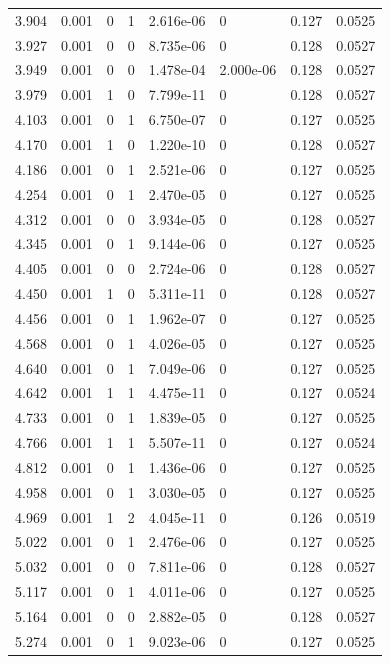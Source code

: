 \documentclass[preview]{standalone}
\begin{document}
{{{\begin{tabular}{L{1.2cm}C{1.2cm} C{0.3cm}C{0.5cm} C{1.4cm}C{1.4cm} C{1.4cm}C{1.4cm}}
  3.904  &  0.001  & 0     &  1 &  2.616e-06  & 0  & 0.127 &  0.0525   \\ 
  3.927  &  0.001  & 0     &  0 &  8.735e-06  & 0  & 0.128 &  0.0527   \\ 
  3.949  &  0.001  & 0     &  0 &  1.478e-04  & 2.000e-06  & 0.128 &  0.0527   \\ 
  3.979  &  0.001  & 1     &  0 &  7.799e-11  & 0  & 0.128 &  0.0527   \\ 
  4.103  &  0.001  & 0     &  1 &  6.750e-07  & 0  & 0.127 &  0.0525   \\ 
  4.170  &  0.001  & 1     &  0 &  1.220e-10  & 0  & 0.128 &  0.0527   \\ 
  4.186  &  0.001  & 0     &  1 &  2.521e-06  & 0  & 0.127 &  0.0525   \\ 
  4.254  &  0.001  & 0     &  1 &  2.470e-05  & 0  & 0.127 &  0.0525   \\ 
  4.312  &  0.001  & 0     &  0 &  3.934e-05  & 0  & 0.128 &  0.0527   \\ 
  4.345  &  0.001  & 0     &  1 &  9.144e-06  & 0  & 0.127 &  0.0525   \\ 
  4.405  &  0.001  & 0     &  0 &  2.724e-06  & 0  & 0.128 &  0.0527   \\ 
  4.450  &  0.001  & 1     &  0 &  5.311e-11  & 0  & 0.128 &  0.0527   \\ 
  4.456  &  0.001  & 0     &  1 &  1.962e-07  & 0  & 0.127 &  0.0525   \\ 
  4.568  &  0.001  & 0     &  1 &  4.026e-05  & 0  & 0.127 &  0.0525   \\ 
  4.640  &  0.001  & 0     &  1 &  7.049e-06  & 0  & 0.127 &  0.0525   \\ 
  4.642  &  0.001  & 1     &  1 &  4.475e-11  & 0  & 0.127 &  0.0524   \\ 
  4.733  &  0.001  & 0     &  1 &  1.839e-05  & 0  & 0.127 &  0.0525   \\ 
  4.766  &  0.001  & 1     &  1 &  5.507e-11  & 0  & 0.127 &  0.0524   \\ 
  4.812  &  0.001  & 0     &  1 &  1.436e-06  & 0  & 0.127 &  0.0525   \\ 
  4.958  &  0.001  & 0     &  1 &  3.030e-05  & 0  & 0.127 &  0.0525   \\ 
  4.969  &  0.001  & 1     &  2 &  4.045e-11  & 0  & 0.126 &  0.0519   \\ 
  5.022  &  0.001  & 0     &  1 &  2.476e-06  & 0  & 0.127 &  0.0525   \\ 
  5.032  &  0.001  & 0     &  0 &  7.811e-06  & 0  & 0.128 &  0.0527   \\ 
  5.117  &  0.001  & 0     &  1 &  4.011e-06  & 0  & 0.127 &  0.0525   \\ 
  5.164  &  0.001  & 0     &  0 &  2.882e-05  & 0  & 0.128 &  0.0527   \\ 
  5.274  &  0.001  & 0     &  1 &  9.023e-06  & 0  & 0.127 &  0.0525   \\ 
\hline 
\end{tabular} 

}}}
\end{document}
